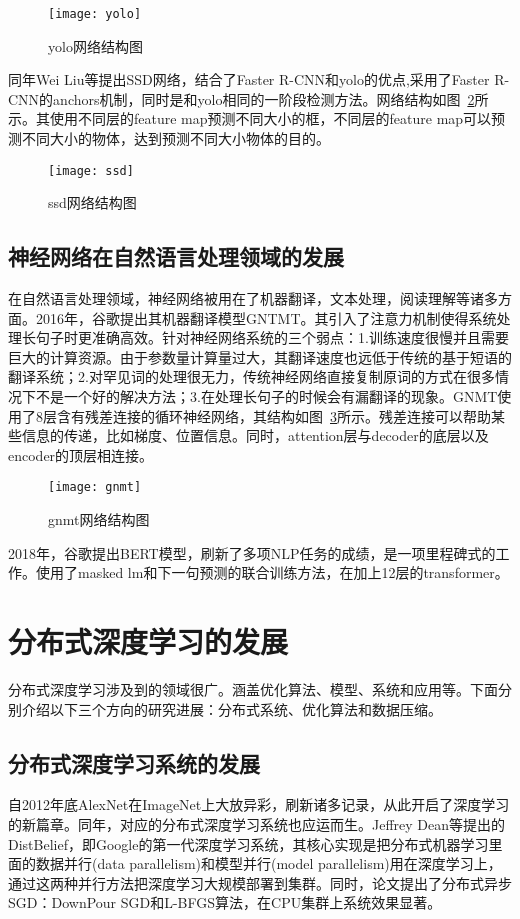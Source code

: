 \begin{figure}[htp]
\centering
\texttt{[image: yolo]}
\caption{yolo网络结构图}
\label{fig:yolo}
\end{figure}
同年Wei Liu等提出SSD网络，结合了Faster R-CNN和yolo的优点,采用了Faster R-CNN的anchors机制，同时是和yolo相同的一阶段检测方法。网络结构如图~\ref{fig:ssd}所示。其使用不同层的feature map预测不同大小的框，不同层的feature map可以预测不同大小的物体，达到预测不同大小物体的目的。

\begin{figure}[htp]
\centering
\texttt{[image: ssd]}
\caption{ssd网络结构图}
\label{fig:ssd}
\end{figure}
\subsection{神经网络在自然语言处理领域的发展}
在自然语言处理领域，神经网络被用在了机器翻译，文本处理，阅读理解等诸多方面。2016年，谷歌提出其机器翻译模型GNTMT。其引入了注意力机制使得系统处理长句子时更准确高效。针对神经网络系统的三个弱点：1.训练速度很慢并且需要巨大的计算资源。由于参数量计算量过大，其翻译速度也远低于传统的基于短语的翻译系统；2.对罕见词的处理很无力，传统神经网络直接复制原词的方式在很多情况下不是一个好的解决方法；3.在处理长句子的时候会有漏翻译的现象。GNMT使用了8层含有残差连接的循环神经网络，其结构如图~\ref{fig:gnmt}所示。残差连接可以帮助某些信息的传递，比如梯度、位置信息。同时，attention层与decoder的底层以及encoder的顶层相连接。

\begin{figure}[htp]
\centering
\texttt{[image: gnmt]}
\caption{gnmt网络结构图}
\label{fig:gnmt}
\end{figure}
2018年，谷歌提出BERT模型，刷新了多项NLP任务的成绩，是一项里程碑式的工作。使用了masked lm和下一句预测的联合训练方法，在加上12层的transformer。
\section{分布式深度学习的发展}
分布式深度学习涉及到的领域很广。涵盖优化算法、模型、系统和应用等。下面分别介绍以下三个方向的研究进展：分布式系统、优化算法和数据压缩。
\subsection{分布式深度学习系统的发展}
自2012年底AlexNet在ImageNet上大放异彩，刷新诸多记录，从此开启了深度学习的新篇章。同年，对应的分布式深度学习系统也应运而生。Jeffrey Dean等提出的DistBelief，即Google的第一代深度学习系统，其核心实现是把分布式机器学习里面的数据并行(data parallelism)和模型并行(model parallelism)用在深度学习上，通过这两种并行方法把深度学习大规模部署到集群。同时，论文提出了分布式异步SGD：DownPour SGD和L-BFGS算法，在CPU集群上系统效果显著。

